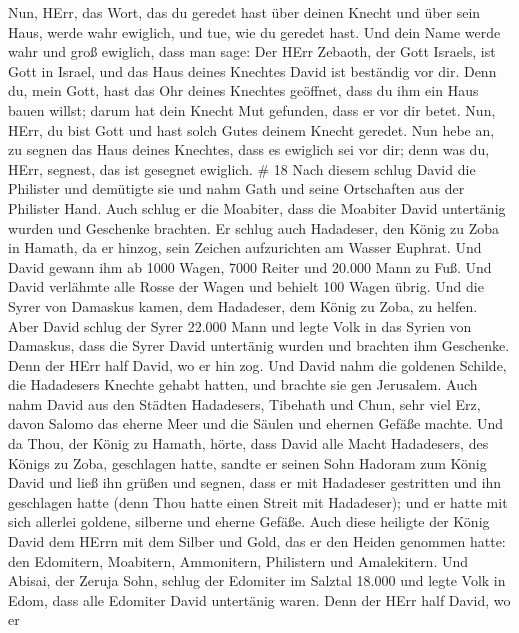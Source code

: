  Nun, HErr, das Wort, das du geredet hast über deinen
Knecht und über sein Haus, werde wahr ewiglich, und tue, wie du geredet
hast.  Und dein Name werde wahr und groß ewiglich, dass man
sage: Der HErr Zebaoth, der Gott Israels, ist Gott in Israel, und das
Haus deines Knechtes David ist beständig vor dir.  Denn du,
mein Gott, hast das Ohr deines Knechtes geöffnet, dass du ihm ein Haus
bauen willst; darum hat dein Knecht Mut gefunden, dass er vor dir betet.
 Nun, HErr, du bist Gott und hast solch Gutes deinem Knecht
geredet.  Nun hebe an, zu segnen das Haus deines Knechtes,
dass es ewiglich sei vor dir; denn was du, HErr, segnest, das ist
gesegnet ewiglich. \# 18  Nach diesem schlug David die
Philister und demütigte sie und nahm Gath und seine Ortschaften aus der
Philister Hand.  Auch schlug er die Moabiter, dass die
Moabiter David untertänig wurden und Geschenke brachten.  Er
schlug auch Hadadeser, den König zu Zoba in Hamath, da er hinzog, sein
Zeichen aufzurichten am Wasser Euphrat.  Und David gewann
ihm ab 1000 Wagen, 7000 Reiter und 20.000 Mann zu Fuß. Und David
verlähmte alle Rosse der Wagen und behielt 100 Wagen übrig. 
Und die Syrer von Damaskus kamen, dem Hadadeser, dem König zu Zoba, zu
helfen. Aber David schlug der Syrer 22.000 Mann  und legte
Volk in das Syrien von Damaskus, dass die Syrer David untertänig wurden
und brachten ihm Geschenke. Denn der HErr half David, wo er hin zog.
 Und David nahm die goldenen Schilde, die Hadadesers Knechte
gehabt hatten, und brachte sie gen Jerusalem.  Auch nahm
David aus den Städten Hadadesers, Tibehath und Chun, sehr viel Erz,
davon Salomo das eherne Meer und die Säulen und ehernen Gefäße machte.
 Und da Thou, der König zu Hamath, hörte, dass David alle
Macht Hadadesers, des Königs zu Zoba, geschlagen hatte, 
sandte er seinen Sohn Hadoram zum König David und ließ ihn grüßen und
segnen, dass er mit Hadadeser gestritten und ihn geschlagen hatte (denn
Thou hatte einen Streit mit Hadadeser); und er hatte mit sich allerlei
goldene, silberne und eherne Gefäße.  Auch diese heiligte
der König David dem HErrn mit dem Silber und Gold, das er den Heiden
genommen hatte: den Edomitern, Moabitern, Ammonitern, Philistern und
Amalekitern.  Und Abisai, der Zeruja Sohn, schlug der
Edomiter im Salztal 18.000  und legte Volk in Edom, dass
alle Edomiter David untertänig waren. Denn der HErr half David, wo er
